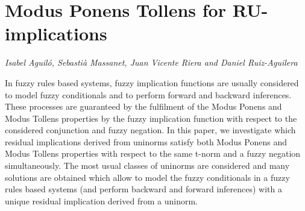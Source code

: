 \documentclass[../booklet.tex]{subfiles}
\begin{document}
\section[Modus Ponens Tollens for RU-implications. {\it Isabel Aguiló, Sebastià Massanet, Juan Vicente Riera and Daniel Ruiz-Aguilera}]{Modus Ponens Tollens for RU-implications}
   

\begin{center}
  {\it Isabel Aguiló, Sebastià Massanet, Juan Vicente Riera and Daniel Ruiz-Aguilera}
\end{center}

\vskip 0.8cm


In fuzzy rules based systems, fuzzy implication functions are usually considered to model fuzzy conditionals and to perform forward and backward inferences. These processes are guaranteed by the fulfilment of the Modus Ponens and Modus Tollens properties by the fuzzy implication function with respect to the considered conjunction and fuzzy negation. In this paper, we investigate which residual implications derived from uninorms satisfy both Modus Ponens and Modus Tollens properties with respect to the same t-norm and a fuzzy negation simultaneously. The most usual classes of uninorms are considered and many solutions are obtained which allow to model the fuzzy conditionals in a fuzzy rules based systems (and perform backward and forward inferences) with a unique residual implication derived from a uninorm.  
\end{document}

